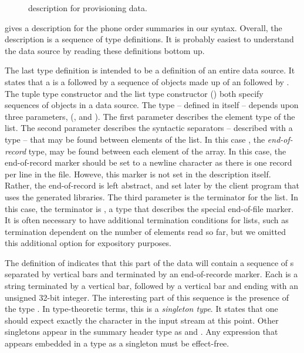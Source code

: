 \suppressfloats

\begin{figure}
  
  \caption{\padsml{} description for \dibbler{} provisioning data.}
  \label{figure:sirius_pml}
\end{figure}


 gives a \padsml{} description for the
\dibbler{} phone order summaries in our syntax.  Overall, the
description is a sequence of type definitions. It is probably easiest
to understand the data source by reading these definitions bottom up.

The last type definition  is intended to be a definition of
an entire \dibbler{} data source.  It states that a  is a
 followed by a sequence of objects made up of an
 followed by .  The tuple type
constructor  and the list type constructor
() both specify sequences of objects in a
data source.  The  type -- defined in \padsml{} itself --
depends upon three parameters, (, and ).
The first parameter describes the element type of the list. The second
parameter describes the syntactic separators -- described with a type
-- that may be found between elements of the list.  In this case
, the {\em end-of-record} type, may be found between each
element of the array.  In this case, the end-of-record marker should
be set to a newline character as there is one record per line in the
file. Howeve, this marker is not set in the description itself.
Rather, the end-of-record is left abstract, and set later by the
client program that uses the generated libraries. The third parameter
is the terminator for the list.  In this case, the terminator is
, a type that describes the special end-of-file marker.  It
is often necessary to have additional termination conditions for
lists, such as termination dependent on the number of elements read so
far, but we omitted this additional option for expository purposes.

The definition of  indicates that this part of the
\dibbler{} data will contain a sequence of s separated by
vertical bars and terminated by an end-of-recorde marker.  Each
 is a string terminated by a vertical bar, followed by a
vertical bar and ending with an unsigned 32-bit integer.  The
interesting part of this sequence is the presence of the type
.  In type-theoretic terms, this is a {\em singleton type}.
It states that one should expect exactly the character  in the
input stream at this point.  Other singletons appear in the summary
header type as  and .  Any expression that appears
embedded in a type as a singleton must be effect-free.

